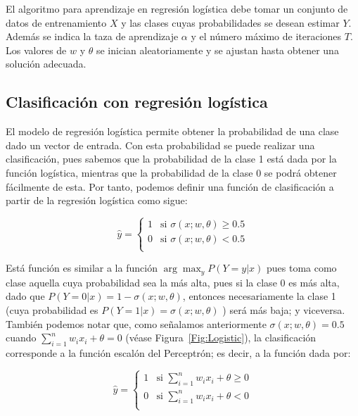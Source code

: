 El algoritmo para aprendizaje en regresión logística debe tomar un conjunto de datos de entrenamiento $X$ y las clases cuyas probabilidades se desean estimar $Y$. Además se indica la taza de aprendizaje $\alpha$ y el número máximo de iteraciones $T$. Los valores de $w$ y $\theta$ se inician aleatoriamente y se ajustan hasta obtener una solución adecuada.


\subsection{Clasificación con regresión logística}

El modelo de regresión logística permite obtener la probabilidad de una clase dado un vector de entrada. Con esta probabilidad se puede realizar una clasificación, pues sabemos que la probabilidad de la clase 1 está dada por la función logística, mientras que la probabilidad de la clase 0 se podrá obtener fácilmente de esta. Por tanto, podemos definir una función de clasificación a partir de la regresión logística como sigue:

\begin{equation*}
    \hat{y} = \begin{cases} 1 & \text{si } \sigma(x; w, \theta) \geq 0.5 \\
        0 & \text{si } \sigma(x; w, \theta) < 0.5 \\
    \end{cases}
\end{equation*}

Está función es similar a la función $\arg\max_y P(Y=y|x)$ pues toma como clase aquella cuya probabilidad sea la más alta, pues si la clase 0 es más alta, dado que $P(Y=0|x) = 1-\sigma(x; w, \theta)$, entonces necesariamente la clase 1 (cuya probabilidad es $P(Y=1|x) = \sigma(x; w, \theta)$ ) será más baja; y viceversa. También podemos notar que, como señalamos anteriormente $\sigma(x; w, \theta) = 0.5$ cuando $\sum_{i=1}^n w_i x_i + \theta = 0$ (véase Figura~\ref{Fig:Logistic}), la clasificación corresponde a la función escalón del Perceptrón; es decir, a la función dada por:

\begin{equation*}
    \hat{y} = \begin{cases} 1 & \text{si } \sum_{i=1}^n w_i x_i + \theta \geq 0 \\
        0 & \text{si } \sum_{i=1}^n w_i x_i + \theta < 0 \\
    \end{cases}
\end{equation*}


